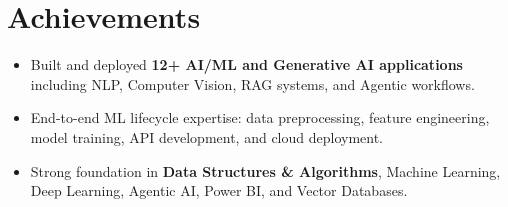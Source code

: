 \documentclass[a4paper,9pt]{article}
\newcommand{\resumeItem}[1]{\item\small #1}
\begin{document}
\section{Achievements}
\begin{itemize}
\resumeItem{Built and deployed \textbf{12+ AI/ML and Generative AI applications} including NLP, Computer Vision, RAG systems, and Agentic workflows.}
\resumeItem{End-to-end ML lifecycle expertise: data preprocessing, feature engineering, model training, API development, and cloud deployment.}
\resumeItem{Strong foundation in \textbf{Data Structures \& Algorithms}, Machine Learning, Deep Learning, Agentic AI, Power BI, and Vector Databases.}
\end{itemize}
\end{document}
